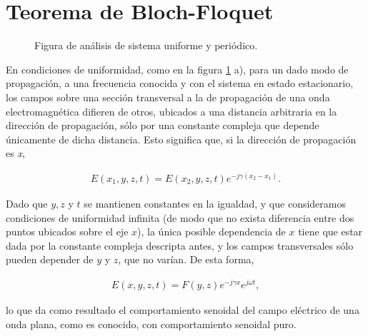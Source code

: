 \section{Teorema de Bloch-Floquet}
\label{sec:bloch-floquet}

\begin{figure}[H]
	\centering 
	\hspace{10pt}
	\caption{Figura de análisis de sistema uniforme y periódico.}
	\label{fig:sistema-periodico-uniforme-geometria}
\end{figure}

En condiciones de uniformidad, como en la figura \ref{fig:sistema-periodico-uniforme-geometria} a), para un dado modo de propagación, a una frecuencia conocida y con el sistema en estado estacionario, los campos sobre una sección transversal a la de propagación de una onda electromagnética difieren de otros, ubicados a una distancia arbitraria en la dirección de propagación, sólo por una constante compleja que depende únicamente de dicha distancia. Esto significa que, si la dirección de propagación es \textit{x},

\begin{align}
	E(x_1,y,z,t) = E(x_2,y,z,t)e^{-j\gamma (x_2 - x_1)}.
\end{align}

Dado que $y,z$ y $t$ se mantienen constantes en la igualdad, y que consideramos condiciones de uniformidad infinita (de modo que no exista diferencia entre dos puntos ubicados sobre el eje $x$), la única posible dependencia de $x$ tiene que estar dada por la constante compleja descripta antes, y los campos transversales sólo pueden depender de $y$ y $z$, que no varían. De esta forma,

\begin{align}
	\label{eq:campo-uniforme}
	E(x,y,z,t) = F(y,z) e^{-j\gamma x} e^{j\omega t},
\end{align}

lo que da como resultado el comportamiento senoidal del campo eléctrico de una onda plana, como es conocido, con comportamiento senoidal puro.


